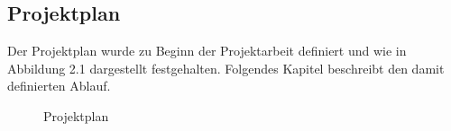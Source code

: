 \subsection{Projektplan}

Der Projektplan wurde zu Beginn der Projektarbeit definiert und wie in Abbildung 2.1 dargestellt festgehalten.
Folgendes Kapitel beschreibt den damit definierten Ablauf.

\begin{figure}[h]
    \centering
    \begin{minipage}[b]{\textwidth}
        \caption{Projektplan}
    \end{minipage}\label{fig:projektplan}
\end{figure}

